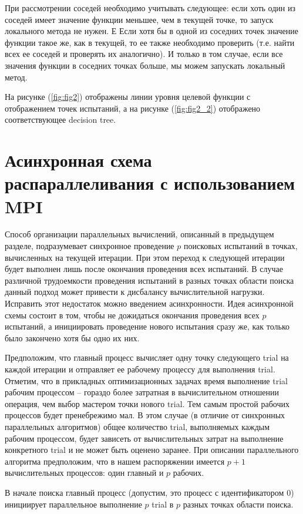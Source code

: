 \documentclass{svproc}
\begin{document}
При рассмотрении соседей необходимо учитывать следующее: если хоть один из соседей имеет значение функции меньшее, чем в текущей точке, то запуск локального метода не нужен. Е
Если хотя бы в одной из соседних точек значение функции такое же, как в текущей, то ее также необходимо проверить (т.е. найти всех ее соседей и проверять их аналогично). И только в том случае, если все значения функции в соседних точках больше, мы можем запускать локальный метод.

На рисунке  (\ref{fig:fig2}) отображены линии уровня целевой функции с отображением точек испытаний, а на рисунке  (\ref{fig:fig2_2}) отображено соответствующее decision tree. 

\section{Асинхронная схема распараллеливания с использованием MPI }

Способ организации параллельных вычислений, описанный в предыдущем разделе, подразумевает синхронное проведение $p$ поисковых испытаний в точках, вычисленных на текущей итерации. При этом переход к следующей итерации будет выполнен лишь после окончания проведения всех испытаний.
В случае различной трудоемкости проведения испытаний в разных точках области поиска данный подход может привести к дисбалансу вычислительной нагрузки. 
Исправить этот недостаток можно введением асинхронности.
Идея асинхронной схемы состоит в том, чтобы не дожидаться окончания проведения всех $p$ испытаний, а инициировать проведение нового испытания сразу же, как только было закончено хотя бы  одно их них. 

Предположим, что главный процесс вычисляет одну точку следующего trial на каждой итерации и отправляет ее рабочему процессу для выполнения trial. Отметим, что в прикладных оптимизационных задачах время выполнение trial рабочим процессом -- гораздо более затратная в вычислительном отношении операция, чем выбор мастером точки нового trial. Тем самым простой рабочих процессов будет пренебрежимо мал. В этом случае (в отличие от синхронных параллельных алгоритмов) общее количество trial, выполняемых каждым рабочим процессом, будет зависеть от вычислительных затрат на выполнение конкретного trial и не может быть оценено заранее. При описании параллельного алгоритма предположим, что в нашем распоряжении имеется $p+1$ вычислительных процессов: один главный и $p$ рабочих.

 В начале поиска главный процесс (допустим, это процесс с идентификатором $0$) инициирует параллельное выполнение $p$ trial в $p$ разных точках области поиска.
\end{document}
